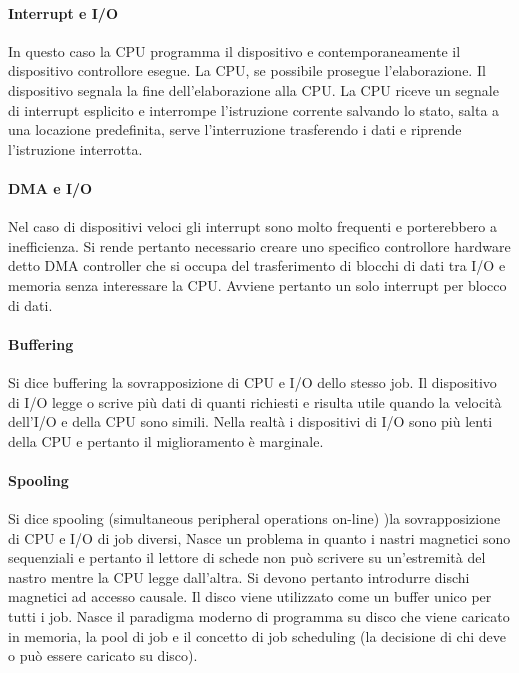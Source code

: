 \paragraph{Interrupt e I/O}
In questo caso la CPU programma il dispositivo e contemporaneamente il dispositivo controllore esegue. La CPU, se possibile prosegue l'elaborazione. Il dispositivo segnala la fine dell'elaborazione alla CPU. La
CPU riceve un segnale di interrupt esplicito e interrompe l'istruzione corrente salvando lo stato, salta a una locazione predefinita, serve l'interruzione trasferendo i dati e riprende l'istruzione interrotta. 
\paragraph{DMA e I/O}
Nel caso di dispositivi veloci gli interrupt sono molto frequenti e porterebbero a inefficienza. Si rende pertanto necessario creare uno specifico controllore hardware detto DMA controller che si occupa del 
trasferimento di blocchi di dati tra I/O e memoria senza interessare la CPU. Avviene pertanto un solo interrupt per blocco di dati. 
\paragraph{Buffering}
Si dice buffering la sovrapposizione di CPU e I/O dello stesso job. Il dispositivo di I/O legge o scrive pi\`u dati di quanti richiesti e risulta utile quando la velocit\`a dell'I/O e della CPU sono simili. Nella realt\`a i 
dispositivi di I/O sono pi\`u lenti della CPU e pertanto il miglioramento \`e marginale.
\paragraph{Spooling}
Si dice spooling (simultaneous peripheral operations on-line) )la sovrapposizione di CPU e I/O di job diversi, Nasce un problema in quanto i nastri magnetici sono sequenziali e pertanto il lettore di schede non 
pu\`o scrivere su un'estremit\`a del nastro mentre la CPU legge dall'altra. Si devono pertanto introdurre dischi magnetici ad accesso causale. Il disco viene utilizzato come un buffer unico per tutti i job. Nasce 
il paradigma moderno di programma su disco che viene caricato in memoria, la pool di job e il concetto di job scheduling (la decisione di chi deve o pu\`o essere caricato su disco). 
